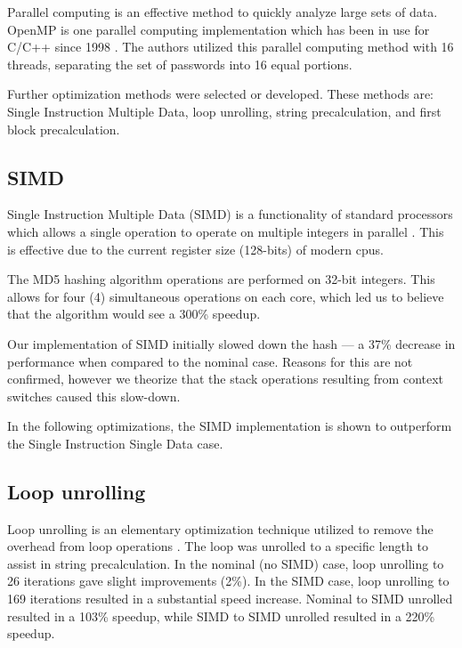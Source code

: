 

	Parallel computing is an effective method to quickly analyze large sets of data. OpenMP is one parallel computing implementation which has been in use for C/C++ since 1998 \cite{openmp}. The authors utilized this parallel computing method with 16 threads, separating the set of passwords into 16 equal portions. 

	Further optimization methods were selected or developed. These methods are: Single Instruction Multiple Data, loop unrolling, string precalculation, and first block precalculation. 

	\subsection{SIMD}
		Single Instruction Multiple Data (SIMD) is a functionality of standard processors which allows a single operation to operate on multiple integers in parallel \cite{simd}. This is effective due to the current register size (128-bits) of modern cpus. 

		The MD5 hashing algorithm operations are performed on 32-bit integers. This allows for four (4) simultaneous operations on each core, which led us to believe that the algorithm would see a 300\% speedup. 

		Our implementation of SIMD initially slowed down the hash --- a 37\% decrease in performance when compared to the nominal case. Reasons for this are not confirmed, however we theorize that the stack operations resulting from context switches caused this slow-down. 

		In the following optimizations, the SIMD implementation is shown to outperform the Single Instruction Single Data case. 

	\subsection{Loop unrolling}
		Loop unrolling is an elementary optimization technique utilized to remove the overhead from loop operations \cite{Dongarra1979}. The loop was unrolled to a specific length to assist in string precalculation. In the nominal (no SIMD) case, loop unrolling to 26 iterations gave slight improvements (2\%). In the SIMD case, loop unrolling to 169 iterations resulted in a substantial speed increase. Nominal to SIMD unrolled resulted in a 103\% speedup, while SIMD to SIMD unrolled resulted in a 220\% speedup.  

